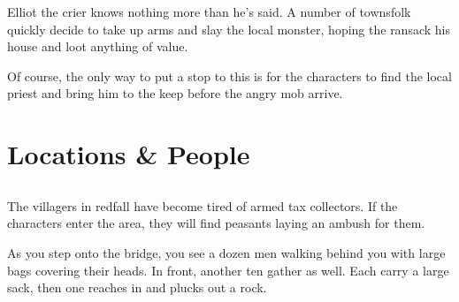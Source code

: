 Elliot the crier knows nothing more than he's said.  A number of townsfolk quickly decide to take up arms and slay the local monster, hoping the ransack his house and loot anything of value.

Of course, the only way to put a stop to this is for the characters to find the local priest and bring him to the keep before the angry mob arrive.

%
%
%
%
%

\section{Locations \& People}

\subsection{}

The villagers in \gls{redfall} have become tired of armed tax collectors.  If the characters enter the area, they will find peasants laying an ambush for them.

\begin{boxtext}

	As you step onto the bridge, you see a dozen men walking behind you with large bags covering their heads.  In front, another ten gather as well.  Each carry a large sack, then one reaches in and plucks out a rock.

\end{boxtext}

